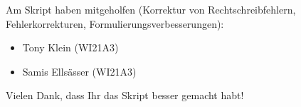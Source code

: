 Am Skript haben mitgeholfen
(Korrektur von Rechtschreibfehlern, Fehlerkorrekturen, Formulierungsverbesserungen):
\begin{itemize}
\item Tony Klein (WI21A3)
\item Samis Ellsässer (WI21A3)
\end{itemize}
Vielen Dank, dass Ihr das Skript besser gemacht habt!
